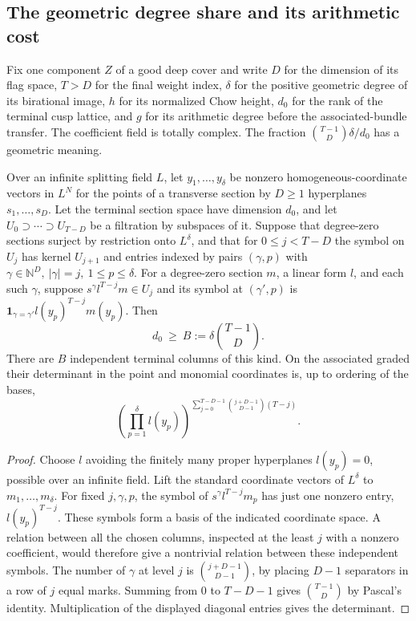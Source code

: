 




\subsection{The geometric degree share and its arithmetic cost}\label{newtheta:HS}

Fix one component \(Z\) of a good deep cover and write \(D\) for the
dimension of its flag space, \(T>D\) for the final weight index,
\(\delta\) for the positive geometric degree of its birational image,
\(h\) for its normalized Chow height, \(d_0\) for the rank of the
terminal cusp lattice, and \(g\) for its arithmetic degree before the
associated-bundle transfer. The coefficient field is totally complex.
The fraction \(\binom{T-1}{D}\delta/d_0\) has a geometric meaning.

\begin{lemma}\label{newtheta:filtration}
Over an infinite splitting field \(L\), let \(y_1,\ldots,y_\delta\)
be nonzero homogeneous-coordinate vectors in \(L^N\) for the points
of a transverse section by \(D\ge1\) hyperplanes \(s_1,\ldots,s_D\).
Let the terminal section space have dimension \(d_0\), and let
\(U_0\supset\cdots\supset U_{T-D}\) be a filtration by subspaces of
it. Suppose that degree-zero sections surject by restriction onto
\(L^\delta\), and that for \(0\le j<T-D\) the symbol on \(U_j\)
has kernel \(U_{j+1}\) and entries indexed by pairs \((\gamma,p)\)
with \(\gamma\in\mathbb N^D,\ |\gamma|=j,\ 1\le p\le\delta\).
For a degree-zero section \(m\), a linear form \(l\), and each such
\(\gamma\), suppose \(s^\gamma l^{T-j}m\in U_j\) and its symbol at
\((\gamma',p)\) is
\(\mathbf1_{\gamma=\gamma'}l(y_p)^{T-j}m(y_p)\). Then
\[
 d_0\ \ge\ B:=\delta\binom{T-1}{D}.
\]
There are \(B\) independent terminal columns of this kind. On the
associated graded their determinant in the point and monomial
coordinates is, up to ordering of the bases,
\[
 \left(\prod_{p=1}^{\delta}l(y_p)\right)^{
       \sum_{j=0}^{T-D-1}\binom{j+D-1}{D-1}(T-j)} .
\]
\end{lemma}
\begin{proof}
Choose \(l\) avoiding the finitely many proper hyperplanes
\(l(y_p)=0\), possible over an infinite field. Lift the standard
coordinate vectors of \(L^\delta\) to \(m_1,\ldots,m_\delta\).
For fixed \(j,\gamma,p\), the symbol of
\(s^\gamma l^{T-j}m_p\) has just one nonzero entry,
\(l(y_p)^{T-j}\). These symbols form a basis of the indicated
coordinate space. A relation between all the chosen columns, inspected
at the least \(j\) with a nonzero coefficient, would therefore give
a nontrivial relation between these independent symbols. The number
of \(\gamma\) at level \(j\) is \(\binom{j+D-1}{D-1}\), by placing
\(D-1\) separators in a row of \(j\) equal marks. Summing from \(0\)
to \(T-D-1\) gives \(\binom{T-1}{D}\) by Pascal's identity.
Multiplication of the displayed diagonal entries gives the determinant.
\end{proof}

